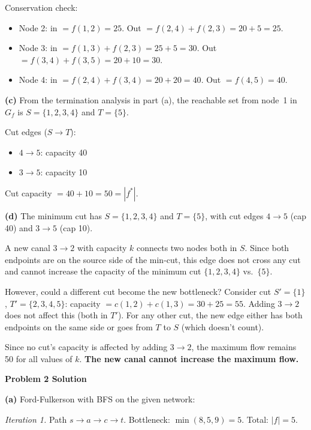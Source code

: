 \documentclass[11pt,a4paper]{article}
\begin{document}
Conservation check:
\begin{itemize}[nosep]
  \item Node 2: in $= f(1,2) = 25$. Out $= f(2,4) + f(2,3) = 20 + 5 = 25$. \checkmark
  \item Node 3: in $= f(1,3) + f(2,3) = 25 + 5 = 30$. Out $= f(3,4) + f(3,5) = 20 + 10 = 30$. \checkmark
  \item Node 4: in $= f(2,4) + f(3,4) = 20 + 20 = 40$. Out $= f(4,5) = 40$. \checkmark
\end{itemize}

\medskip

\textbf{(c)} From the termination analysis in part (a), the reachable set from node~1 in $G_f$ is $S = \{1, 2, 3, 4\}$ and $T = \{5\}$.

Cut edges ($S \to T$):
\begin{itemize}[nosep]
  \item $4 \to 5$: capacity 40
  \item $3 \to 5$: capacity 10
\end{itemize}

Cut capacity $= 40 + 10 = 50 = |f^*|$. \checkmark

\medskip

\textbf{(d)} The minimum cut has $S = \{1,2,3,4\}$ and $T = \{5\}$, with cut edges $4\to 5$ (cap 40) and $3\to 5$ (cap 10).

A new canal $3 \to 2$ with capacity $k$ connects two nodes both in $S$. Since both endpoints are on the source side of the min-cut, this edge does not cross any cut and cannot increase the capacity of the minimum cut $\{1,2,3,4\}$ vs.\ $\{5\}$.

However, could a different cut become the new bottleneck? Consider cut $S'=\{1\}$, $T'=\{2,3,4,5\}$: capacity $= c(1,2)+c(1,3) = 30+25=55$. Adding $3\to 2$ does not affect this (both in $T'$). For any other cut, the new edge either has both endpoints on the same side or goes from $T$ to $S$ (which doesn't count).

Since no cut's capacity is affected by adding $3\to 2$, the maximum flow remains 50 for all values of $k$. \textbf{The new canal cannot increase the maximum flow.}

\newpage

\textbf{\large Problem 2 Solution}
\medskip

\textbf{(a)} Ford-Fulkerson with BFS on the given network:

\textit{Iteration 1.} Path $s \to a \to c \to t$. Bottleneck: $\min(8, 5, 9) = 5$. Total: $|f|=5$.
\end{document}

